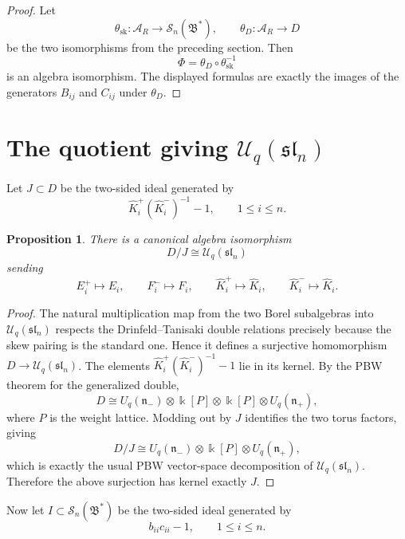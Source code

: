 \documentclass[11pt]{article}
\newtheorem{proposition}[theorem]{Proposition}
\newcommand{\kfield}{\Bbbk}
\newcommand{\Uc}{\mathcal U}
\newcommand{\Sc}{\mathcal S}
\newcommand{\fB}{\mathfrak B}
\newcommand{\slfr}{\mathfrak{sl}}
\begin{document}
\begin{proof}
Let
\[
\theta_{\mathrm{sk}}:\mathcal A_R\to \Sc_n(\fB^*),
\qquad
\theta_D:\mathcal A_R\to D
\]
be the two isomorphisms from the preceding section.  Then
\[
\Phi=\theta_D\circ \theta_{\mathrm{sk}}^{-1}
\]
is an algebra isomorphism.  The displayed formulas are exactly the images of the generators \(B_{ij}\) and \(C_{ij}\) under \(\theta_D\).
\end{proof}

\section{The quotient giving \(\Uc_q(\slfr_n)\)}

Let \(J\subset D\) be the two-sided ideal generated by
\[
\widehat K_i^+(\widehat K_i^-)^{-1}-1,\qquad 1\leq i\leq n .
\]

\begin{proposition}
There is a canonical algebra isomorphism
\[
D/J \cong \Uc_q(\slfr_n)
\]
sending
\[
E_i^+\mapsto E_i,\qquad
F_i^-\mapsto F_i,\qquad
\widehat K_i^+\mapsto \widehat K_i,\qquad
\widehat K_i^-\mapsto \widehat K_i .
\]
\end{proposition}

\begin{proof}
The natural multiplication map from the two Borel subalgebras into \(\Uc_q(\slfr_n)\) respects the Drinfeld--Tanisaki double relations precisely because the skew pairing is the standard one.  Hence it defines a surjective homomorphism \(D\to \Uc_q(\slfr_n)\).  The elements \(\widehat K_i^+(\widehat K_i^-)^{-1}-1\) lie in its kernel.  By the PBW theorem for the generalized double,
\[
D \cong U_q(\mathfrak n_-)\otimes \kfield[P]\otimes \kfield[P]\otimes U_q(\mathfrak n_+),
\]
where \(P\) is the weight lattice.  Modding out by \(J\) identifies the two torus factors, giving
\[
D/J \cong
U_q(\mathfrak n_-)\otimes \kfield[P]\otimes U_q(\mathfrak n_+),
\]
which is exactly the usual PBW vector-space decomposition of \(\Uc_q(\slfr_n)\).  Therefore the above surjection has kernel exactly \(J\).
\end{proof}

Now let \(I\subset \Sc_n(\fB^*)\) be the two-sided ideal generated by
\[
b_{ii}c_{ii}-1,\qquad 1\leq i\leq n .
\]
\end{document}
